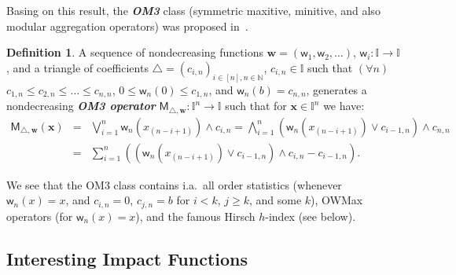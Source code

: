 \documentclass[11pt]{article}\usepackage[]{graphicx}\usepackage[]{color}
\renewcommand{\emph}[1]{\textbf{\textsl{#1}}}
\newcommand{\vect}[1]{{\mathbf{#1}}}
\newcommand{\func}[1]{{\mathsf{#1}}}
\newcommand{\Naturals}{\mathbb{N}}
\newcommand{\Ival}{\mathbb{I}}
\newcommand{\IvalPow}[1]{\mathbb{I}^{#1}}
\theoremstyle{remark}
\theoremstyle{definition}
\newtheorem{definition}[theorem]{Definition}
\begin{document}
\begin{center}
\end{center}

Basing on this result, the \emph{OM3} class
(symmetric maxitive, minitive, and also modular
aggregation operators) was proposed
in~\cite{CenaGagolewski2013:agop1,CenaGagolewski2013:agop2}.

\bigskip
\begin{definition}
A sequence of nondecreasing functions $\vect{w}=(\func{w}_1,\func{w}_2,\dots)$,
$\func{w}_i :\Ival\to\Ival$,
 and a triangle of coefficients
 $\triangle=(c_{i,n})_{i\in[n],n\in\Naturals}$, $c_{i,n}\in\Ival$
 such that $(\forall n)$ $c_{1,n}\le c_{2,n}\le \dots \le c_{n,n}$,
 $0\le\func{w}_n(0)\le c_{1,n}$, and
 $\func{w}_n(b)=c_{n,n}$,
 generates a nondecreasing \emph{OM3 operator}
 $\func{M}_{\triangle,\vect{w}}:\IvalPow{n}\to\Ival$
 such that for $\vect{x}\in\IvalPow{n}$ we have:
\begin{eqnarray*}
\func{M}_{\triangle,\vect{w}}(\mathbf{x})&=&\bigvee_{i=1}^n
\func{w}_n(x_{(n-i+1)})\wedge c_{i,n} =  \bigwedge_{i=1}^n (\func{w}_n(x_{(n-i+1)}) \vee c_{i-1,n}) \wedge c_{n,n}\\
&=& \sum_{i=1}^n \left(\left(\func{w}_n(x_{(n-i+1)})\vee c_{i-1,n}\right) \wedge
c_{i,n} - c_{i-1,n}\right).
\end{eqnarray*}
\end{definition}
\bigskip

We see that the OM3 class contains i.a.~all
order statistics (whenever $\func{w}_n(x)=x$,
and $c_{i,n}=0$, $c_{j,n}=b$ for $i< k$, $j\ge k$, and some $k$),
OWMax operators (for $\func{w}_n(x)=x$),
and the famous
Hirsch $h$-index (see below).


\subsection{Interesting Impact Functions}
\end{document}
